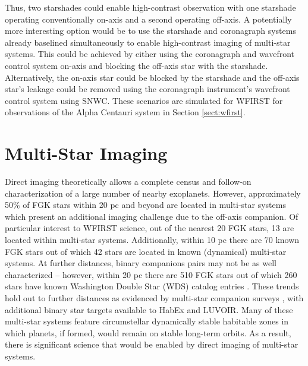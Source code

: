 \documentclass[]{spie}  %
\begin{document}
Thus, two starshades could enable high-contrast observation with one starshade operating conventionally on-axis and a second operating off-axis. A potentially more interesting option would be to use the starshade and coronagraph systems already baselined simultaneously to enable high-contrast imaging of multi-star systems. This could be achieved by either using the coronagraph and wavefront control system on-axis and blocking the off-axis star with the starshade. Alternatively, the on-axis star could be blocked by the starshade and the off-axis star's leakage could be removed using the coronagraph instrument's wavefront control system using SNWC. These scenarios are simulated for WFIRST for observations of the Alpha Centauri system in Section \ref{sect:wfirst}.

\section{Multi-Star Imaging} \label{sect:multiStar} \label{sect:multiStarImaging}

Direct imaging theoretically allows a complete census and follow-on characterization of a large number of nearby exoplanets. However, approximately 50\% of FGK stars within 20 pc and beyond are located in multi-star systems which present an additional imaging challenge due to the off-axis companion. Of particular interest to WFIRST science, out of the nearest 20 FGK stars, 13 are located within multi-star systems. Additionally, within 10 pc there are 70 known FGK stars out of which 42 stars are located in known (dynamical) multi-star systems. At further distances, binary companions pairs may not be as well characterized -- however, within 20 pc there are 510 FGK stars out of which 260 stars have known Washington Double Star (WDS) catalog entries \cite{Mason01}. These trends hold out to further distances as evidenced by multi-star companion surveys \cite{Raghavan10, Tokovinin14}, with additional binary star targets available to HabEx and LUVOIR. Many of these multi-star systems feature circumstellar dynamically stable habitable zones in which planets, if formed, would remain on stable long-term orbits. As a result, there is significant science that would be enabled by direct imaging of multi-star systems. 
\end{document}
